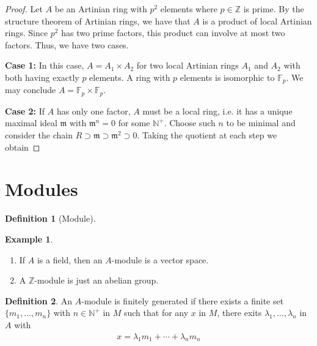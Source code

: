 \documentclass[a4paper]{book}
\theoremstyle{definition}
\newtheorem{definition}{Definition}[]
\newtheorem{example}{Example}[definition]
\begin{document}
\begin{proof}
    Let \(A\) be an Artinian ring with \(p^2\) elements where \(p \in \mathbb{Z}\) is prime. By the structure theorem of Artinian rings, we have that \(A\) is a product of local Artinian rings. Since \(p^2\) has two prime factors, this product can involve at most two factors. Thus, we have two cases.

    \textbf{Case 1:} In this case, \(A = A_1 \times A_2\) for two local Artinian rings \(A_1\) and \(A_2\) with both having exactly \(p\) elements. A ring with \(p\) elements is isomorphic to \(\mathbb{F}_p\). We may conclude \(A = \mathbb{F}_p \times \mathbb{F}_p\).

    \textbf{Case 2:} If \(A\) has only one factor, \(A\) must be a local ring, i.e. it has a unique maximal ideal \(\mathfrak{m}\) with \(\mathfrak{m}^n = 0\) for some \(\mathbb{N}^+\). Choose such \(n\) to be minimal and consider the chain \(R \supset \mathfrak{m} \supset \mathfrak{m}^2 \supset 0\). Taking the quotient at each step we obtain 
\end{proof}

\part{Modules}

\begin{defbox}
    \begin{definition}[Module]
    \end{definition}
\end{defbox}

\begin{exmbox}
    \begin{example}
        \begin{enumerate}
            \item If \(A\) is a field, then an \(A\)-module is a vector space.
            \item A \(\mathbb{Z}\)-module is just an abelian group.
        \end{enumerate}
    \end{example}
\end{exmbox}

\begin{defbox}
    \begin{definition}
        An \(A\)-module is finitely generated if there exists a finite set \(\{m_1, \ldots, m_n\}\) with \(n \in \mathbb{N}^+\) in \(M\) such that for any \(x\) in \(M\), there exits \(\lambda_1, \ldots, \lambda_n\) in \(A\) with
        \begin{align*}
            x = \lambda_1 m_1 + \cdots + \lambda_n m_n
        \end{align*}
    \end{definition}
\end{defbox}
\end{document}
